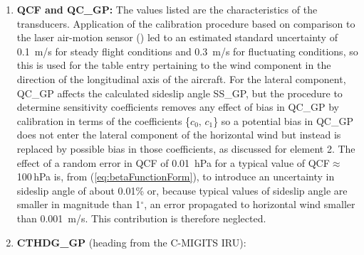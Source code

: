\documentclass[12pt,twoside,english]{article}\usepackage[]{graphicx}\usepackage[]{color}
\let\OrgIndex\index
\renewcommand*{\index}[1]{\OrgIndex{#1}}
\begin{document}
\begin{enumerate}
\item \textbf{QCF and QC\_GP:} 
The values listed are the characteristics of the transducers. Application of the calibration procedure based on comparison to the laser air-motion sensor (\citet{CooperEtAl2014}) led to an estimated standard uncertainty of 0.1~m/s for steady flight conditions and 0.3~m/s for fluctuating conditions, so this is used for the table entry pertaining to the wind component in the direction of the longitudinal axis of the aircraft. For the lateral component, QC\_GP affects the calculated sideslip angle SS\_GP, but the procedure to determine sensitivity coefficients removes any effect of bias in QC\_GP by calibration in terms of the coefficients \{$c_{0},\,c_{1}$\} so a potential bias in QC\_GP does not enter the lateral component of the horizontal wind but instead is replaced by possible bias in those coefficients, as discussed for element 2. The effect of a random error in QCF of 0.01~hPa for a typical value of QCF$\approx$100\,hPa is, from (\ref{eq:betaFunctionForm}), to introduce an uncertainty in sideslip angle of about 0.01\% or, because typical values of sideslip angle are smaller in magnitude than 1$^{\circ}$, an error propagated to horizontal wind smaller than 0.001~m/s. This contribution is therefore neglected.  
\item \textbf{CTHDG\_GP} (heading from the C-MIGITS IRU): 

\end{enumerate}
\end{document}

